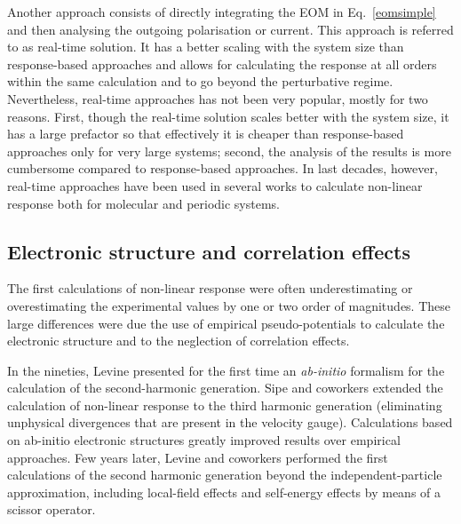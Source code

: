 Another approach consists of directly integrating the EOM in Eq.~\ref{eomsimple}  and then analysing the outgoing polarisation or current. This approach is referred to as real-time solution. It has a better scaling with the system size than response-based approaches and allows for calculating the response at all orders within the same calculation and to go beyond the perturbative regime. Nevertheless, real-time approaches has not been very popular, mostly for two reasons. First, though the real-time solution scales better with the system size, it has a large prefactor so that effectively it is cheaper than response-based approaches only for very large systems; second, the analysis of the results is more cumbersome compared to response-based approaches. In last decades, however, real-time approaches have been used in several works to calculate non-linear response both for molecular\cite{takimoto:154114,ding2013efficient} and periodic systems.\cite{goncharov2013nonlinear}


\subsection{Electronic structure and correlation effects}
The first calculations of non-linear response were often underestimating or overestimating the experimental values by one or two order of magnitudes.\cite{PhysRevB.12.2325,PhysRevB.36.9708}
These large differences were due the use of empirical pseudo-potentials to calculate the electronic structure and to the neglection of correlation effects.  

In the nineties, Levine\cite{PhysRevB.42.3567} presented for the first time an \emph{ab-initio} formalism for the calculation of the second-harmonic generation. Sipe and coworkers extended the calculation of non-linear response to the third harmonic generation\cite{PhysRevB.61.5337,PhysRevB.48.11705} (eliminating unphysical divergences that are present in the velocity gauge). Calculations based on ab-initio electronic structures greatly improved results over empirical approaches. Few years later, Levine and coworkers performed the first calculations of the second harmonic generation beyond the independent-particle approximation, including local-field effects and self-energy effects by means of a scissor operator.\cite{PhysRevLett.63.1719,PhysRevB.56.1787} 

